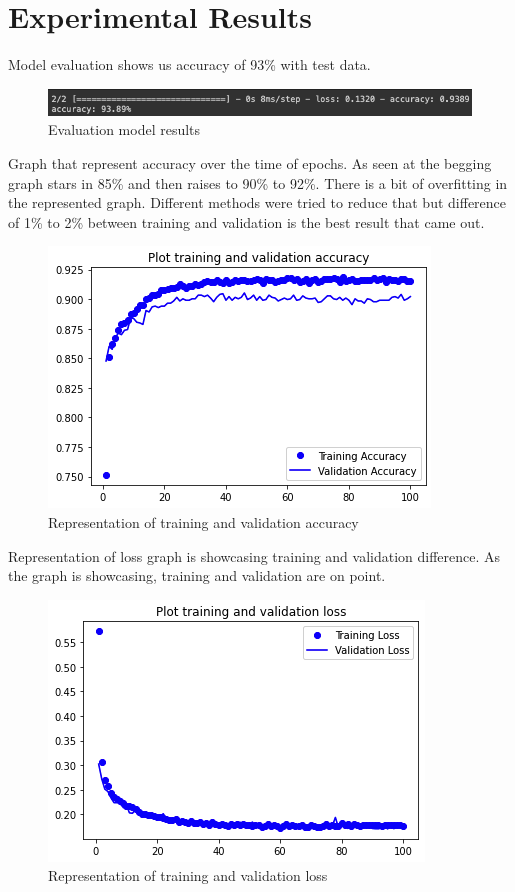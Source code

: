\section{Experimental Results}

Model evaluation shows us accuracy of 93\% with test data.
\begin{figure}[H]
\includegraphics[scale=0.55]{img/evaluateModel.png}
\centering
\caption{Evaluation model results}
\end{figure}
Graph that represent accuracy over the time of epochs. As seen at the begging graph stars in 85\% and then raises to 90\% to 92\%. There is a bit of overfitting in the represented graph. Different methods were tried to reduce that but difference of 1\% to 2\% between training and validation is the best result that came out.
\begin{figure}[H]
\includegraphics[scale=0.7]{img/trainingAndValidationAccuracy.jpeg}
\centering
\caption{Representation of training and validation accuracy}
\end{figure}
Representation of loss graph is showcasing training and validation difference. As the graph is showcasing, training and validation are on point.
\begin{figure}[H]
\includegraphics[scale=0.7]{img/trainingAndValidationLoss.jpeg}
\centering
\caption{Representation of training and validation loss}
\end{figure}
